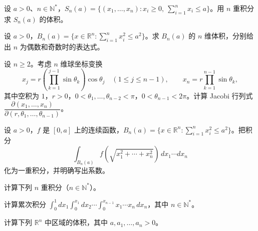 \noindent\begin{minipage}{\textwidth}
设 $a>0$、$n\in\mathbb N^*$，$S_n(a)=\{(x_1,\ldots,x_n):x_i\ge0,\ \sum_{i=1}^nx_i\le a\}$。用 $n$ 重积分求 $S_n(a)$ 的体积。
\end{minipage}\par\vfill
\newpage
\noindent\begin{minipage}{\textwidth}
设 $a>0$，$B_n(a)=\{x\in\mathbb R^n:\sum_{i=1}^nx_i^2\le a^2\}$。求 $B_n(a)$ 的 $n$ 维体积，分别给出 $n$ 为偶数和奇数时的表达式。
\end{minipage}\par\vfill
\noindent\begin{minipage}{\textwidth}
设 $n\ge2$。考虑 $n$ 维球坐标变换\[x_j=r\left(\prod_{k=1}^{j-1}\sin\theta_k\right)\cos\theta_j\quad(1\le j\le n-1),\qquad x_n=r\prod_{k=1}^{n-1}\sin\theta_k,\]其中空积为 $1$，$r>0$，$0<\theta_1,\ldots,\theta_{n-2}<\pi$，$0<\theta_{n-1}<2\pi$。计算 Jacobi 行列式 $\dfrac{\partial(x_1,\ldots,x_n)}{\partial(r,\theta_1,\ldots,\theta_{n-1})}$。
\end{minipage}\par\vfill
\noindent\begin{minipage}{\textwidth}
设 $a>0$，$f$ 是 $[0,a]$ 上的连续函数，$B_n(a)=\{x\in\mathbb R^n:\sum_{i=1}^nx_i^2\le a^2\}$。把积分\[\int_{B_n(a)}f\!\left(\sqrt{x_1^2+\cdots+x_n^2}\right)\,dx_1\cdots dx_n\]化为一重积分，并明确写出系数。
\end{minipage}\par\vfill
\newpage
\noindent\begin{minipage}{\textwidth}
计算下列 $n$ 重积分（$n\in\mathbb N^*$）。
\end{minipage}\par\vfill
\noindent\begin{minipage}{\textwidth}
计算累次积分 $\displaystyle\int_0^1dx_1\int_0^{x_1}dx_2\cdots\int_0^{x_{n-1}}x_1\cdots x_n\,dx_n$，其中 $n\in\mathbb N^*$。
\end{minipage}\par\vfill
\noindent\begin{minipage}{\textwidth}
计算下列 $\mathbb R^n$ 中区域的体积，其中 $a,a_1,\ldots,a_n>0$。
\end{minipage}\par\vfill
